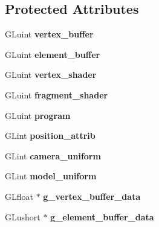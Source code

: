 \subsection*{Protected Attributes}
\begin{DoxyCompactItemize}
\item 
\hypertarget{classGameAsset_a1a1d227eba2765b025f9f453700c2359}{G\-Luint {\bfseries vertex\-\_\-buffer}}\label{classGameAsset_a1a1d227eba2765b025f9f453700c2359}

\item 
\hypertarget{classGameAsset_a5e005ff1d4280e73f67446353e78fe43}{G\-Luint {\bfseries element\-\_\-buffer}}\label{classGameAsset_a5e005ff1d4280e73f67446353e78fe43}

\item 
\hypertarget{classGameAsset_aba95de2870f78ac21568bbf9dd7e2b40}{G\-Luint {\bfseries vertex\-\_\-shader}}\label{classGameAsset_aba95de2870f78ac21568bbf9dd7e2b40}

\item 
\hypertarget{classGameAsset_ab62d9e2547537bd89eeae057a402a895}{G\-Luint {\bfseries fragment\-\_\-shader}}\label{classGameAsset_ab62d9e2547537bd89eeae057a402a895}

\item 
\hypertarget{classGameAsset_a239f03ead1a34924e76d6f875216404b}{G\-Luint {\bfseries program}}\label{classGameAsset_a239f03ead1a34924e76d6f875216404b}

\item 
\hypertarget{classGameAsset_ad8c8198dcc470301e8f5eae8dc8506bb}{G\-Lint {\bfseries position\-\_\-attrib}}\label{classGameAsset_ad8c8198dcc470301e8f5eae8dc8506bb}

\item 
\hypertarget{classGameAsset_a402a20952864f5992ee3c42a9d7e977f}{G\-Lint {\bfseries camera\-\_\-uniform}}\label{classGameAsset_a402a20952864f5992ee3c42a9d7e977f}

\item 
\hypertarget{classGameAsset_aa39bb998856e0065e1ead5f192fb995c}{G\-Lint {\bfseries model\-\_\-uniform}}\label{classGameAsset_aa39bb998856e0065e1ead5f192fb995c}

\item 
\hypertarget{classGameAsset_ae1d682ecf84d9cd3f91a8c870acf2777}{G\-Lfloat $\ast$ {\bfseries g\-\_\-vertex\-\_\-buffer\-\_\-data}}\label{classGameAsset_ae1d682ecf84d9cd3f91a8c870acf2777}

\item 
\hypertarget{classGameAsset_ab859393c9158c8bda39cd100475fee25}{G\-Lushort $\ast$ {\bfseries g\-\_\-element\-\_\-buffer\-\_\-data}}\label{classGameAsset_ab859393c9158c8bda39cd100475fee25}


\end{DoxyCompactItemize}
